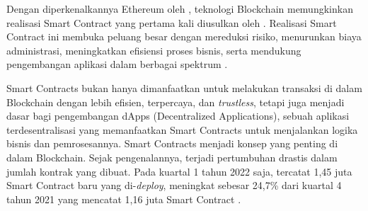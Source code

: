 Dengan diperkenalkannya Ethereum oleh \cite{buterin2013ethereum}, teknologi Blockchain memungkinkan realisasi Smart Contract yang pertama kali diusulkan oleh \cite{szabo1997formalizing}. Realisasi Smart Contract ini membuka peluang besar dengan mereduksi risiko, menurunkan biaya administrasi, meningkatkan efisiensi proses bisnis, serta mendukung pengembangan aplikasi dalam berbagai spektrum \parencite{zheng2020overview}. 

Smart Contracts bukan hanya dimanfaatkan untuk melakukan transaksi di dalam Blockchain dengan lebih efisien, terpercaya, dan \textit{trustless}, tetapi juga menjadi dasar bagi pengembangan dApps (Decentralized Applications), sebuah aplikasi terdesentralisasi yang memanfaatkan Smart Contracts untuk menjalankan logika bisnis dan pemrosesannya. Smart Contracts menjadi konsep yang penting di dalam Blockchain. Sejak pengenalannya, terjadi pertumbuhan drastis dalam jumlah kontrak yang dibuat. Pada kuartal 1 tahun 2022 saja, tercatat 1,45 juta Smart Contract baru yang di-\textit{deploy}, meningkat sebesar 24,7\% dari kuartal 4 tahun 2021 yang mencatat 1,16 juta Smart Contract \parencite{alchemy_ethereum_statistics}. 

